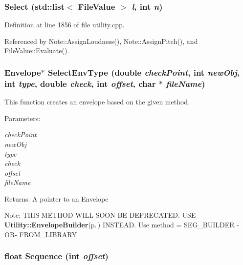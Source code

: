 \subsubsection{ Select (std::list$<$ {\bf File\-Value} $>$ {\em l}, int {\em n})}\label{utility_8h_a50}




Definition at line 1856 of file utility.cpp.

Referenced by Note::Assign\-Loudness(), Note::Assign\-Pitch(), and File\-Value::Evaluate().
\subsubsection{\setlength{\rightskip}{0pt plus 5cm}Envelope$\ast$ Select\-Env\-Type (double {\em check\-Point}, int {\em new\-Obj}, int {\em type}, double {\em check}, int {\em offset}, char $\ast$ {\em file\-Name})}\label{utility_8h_a22}


This function creates an envelope based on the given method. \begin{Desc}
\item[Parameters:]
\begin{description}
\item[{\em check\-Point}]\item[{\em new\-Obj}]\item[{\em type}]\item[{\em check}]\item[{\em offset}]\item[{\em file\-Name}]\end{description}
\end{Desc}
\begin{Desc}
\item[Returns:]A pointer to an Envelope \end{Desc}
\begin{Desc}
\item[Note:]THIS METHOD WILL SOON BE DEPRECATED. USE {\bf Utility::Envelope\-Builder}{\rm (p.\,\pageref{utility_8h_a19})} INSTEAD. Use method = SEG\_\-BUILDER -OR- FROM\_\-LIBRARY \end{Desc}
\subsubsection{\setlength{\rightskip}{0pt plus 5cm}float Sequence (int {\em offset})}\label{utility_8h_a27}



